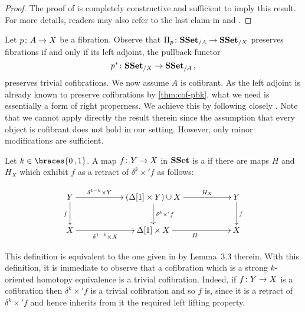 \documentclass[reqno,10pt,a4paper,oneside,draft]{amsart}
\begin{document}
\begin{proof}The proof of \cite[Theorem~3.2.3]{joyal-tierney:simplicial-homotopy-theory} is completely constructive and sufficient to imply this result.
For more details, readers may also refer to the last claim in \cite[Corollary~5.3.2]{henry2018wms}
and \cite[Proposition~5.2.6]{henry2018wms}.
\end{proof}




\medskip

Let $p \colon A \rightarrow X$ be a fibration. Observe that $\Pi_p \colon \mathbf{SSet}_{/A} \to \mathbf{SSet}_{/X}$  preserves fibrations if and only if its left adjoint, the pullback functor
\[
p^* \colon \mathbf{SSet}_{/X} \to \mathbf{SSet}_{/A} \, , 
\]
preserves trivial cofibrations. We now assume  $A$ is cofibrant. 
As the left adjoint is already known to preserve cofibrations by \cref{thm:cof-pbk}, what we need is essentially a form of right properness. We achieve this by following closely \cite[Section~3]{gambino2017frobenius}. Note that we cannot apply directly the result therein since 
the assumption that every object is cofibrant does not hold in our setting. However, only minor modifications are sufficient.




\begin{definition} \label{def:strhtpyequiv} Let $k \in \braces{0 \, , 1 }$.
A map $f \colon Y \rightarrow X$ in $\mathbf{SSet}$ is a  if there are maps $H$ and $H_X$ which exhibit $f$ as a retract of $\delta^k \times ' f$ as follows:

\[
\xymatrix@C=2cm{
Y \ar[d]_{f} \ar[r]^-{\delta^{1-k} \times Y} & 
( \Delta[1] \times Y ) \cup X \ar[d]^{\delta^k \times' f} \ar[r]^-{H_X} & 
Y \ar[d]^{f} \\
X \ar[r]_-{\delta^{1-k} \times X}  & 
\Delta[1] \times X \ar[r]_{H} &
X  }
\]
\end{definition}

This definition is equivalent to the one given in \cite{gambino2017frobenius} by Lemma~3.3 therein.
With this definition, it is immediate to observe that a cofibration which is a strong $k$-oriented homotopy equivalence is a trivial cofibration. Indeed, if $f \colon Y \to X$ is a cofibration then $\delta^k \times ' f$ is a trivial
cofibration and so $f$ is, since it is a retract of $\delta^k \times ' f$ and hence inherits from it the
required left lifting property.
\end{document}
